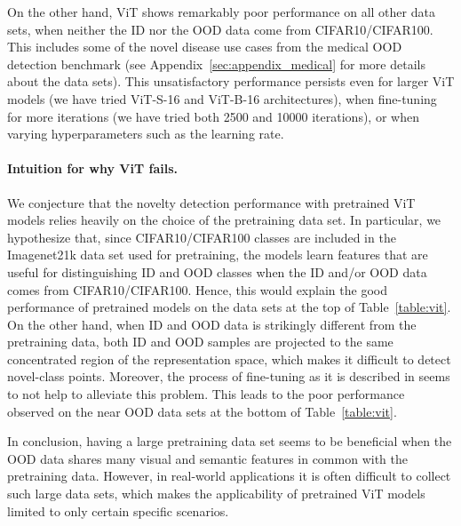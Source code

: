On the other hand, ViT shows remarkably poor performance on all other data sets,
when neither the ID nor the OOD data come from CIFAR10/CIFAR100. This includes
some of the novel disease use cases from the medical OOD detection benchmark
(see Appendix~\ref{sec:appendix_medical} for more details about the data sets).
This unsatisfactory performance persists even for larger ViT models (we
have tried ViT-S-16 and ViT-B-16 architectures), when fine-tuning for more
iterations (we have tried both 2500 and 10000 iterations), or when varying
hyperparameters such as the learning rate.

\paragraph{Intuition for why ViT fails.} We conjecture that the novelty
detection performance with pretrained ViT models relies heavily on the choice of
the pretraining data set. In particular, we hypothesize that, since
CIFAR10/CIFAR100 classes are included in the Imagenet21k data set used for
pretraining, the models learn features that are useful for distinguishing ID and
OOD classes when the ID and/or OOD data comes from CIFAR10/CIFAR100. Hence, this
would explain the good performance of pretrained models on the data sets at the
top of Table~\ref{table:vit}. On the other hand, when ID and OOD data is
strikingly different from the pretraining data, both ID and OOD samples are
projected to the same concentrated region of the representation space, which
makes it difficult to detect novel-class points.  Moreover, the process of
fine-tuning as it is described in \citet{fort2021} seems to not help to
alleviate this problem. This leads to the poor performance observed on the near
OOD data sets at the bottom of Table~\ref{table:vit}.

In conclusion, having a large pretraining data set seems to be beneficial when
the OOD data shares many visual and semantic features in common with the
pretraining data. However, in real-world applications it is often difficult to
collect such large data sets, which makes the applicability of pretrained ViT
models limited to only certain specific scenarios.

